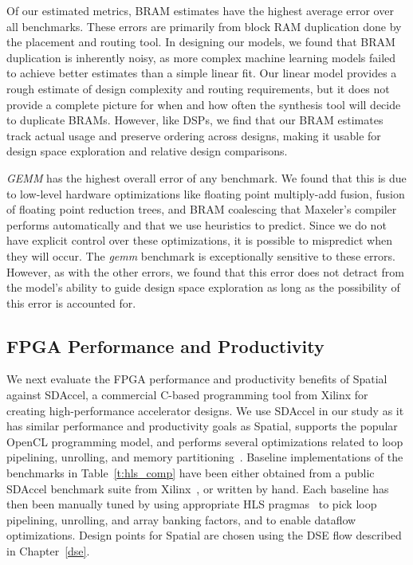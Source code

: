 Of our estimated metrics, BRAM estimates have the highest average error over all benchmarks. These errors are primarily from block RAM duplication done by the placement and routing tool. In designing our models, we found that BRAM duplication is inherently noisy, as more complex machine learning models failed to achieve better estimates than a simple linear fit. Our linear model provides a rough estimate of design complexity and routing requirements, but it does not provide a complete picture for when and how often the synthesis tool will decide to duplicate BRAMs. However, like DSPs, we find that our BRAM estimates track actual usage and preserve ordering across designs, making it usable for design space exploration and relative design comparisons.

\emph{GEMM} has the highest overall error of any benchmark. We found that this is due to low-level hardware optimizations like floating point multiply-add fusion, fusion of floating point reduction trees, and BRAM coalescing that Maxeler's compiler performs automatically and that we use heuristics to predict. Since we do not have explicit control over these optimizations, it is possible to mispredict when they will occur. The \emph{gemm} benchmark is exceptionally sensitive to these errors. However, as with the other errors, we found that this error does not detract from the model's ability to guide design space exploration as long as the possibility of this error is accounted for.


\subsection{FPGA Performance and Productivity}



We next evaluate the FPGA performance and productivity benefits of Spatial against SDAccel, a commercial C-based programming tool from Xilinx for creating high-performance accelerator designs. We use SDAccel in our study as it has similar performance and productivity goals as Spatial, supports the popular OpenCL programming model, and performs several optimizations related to loop pipelining, unrolling, and memory partitioning~\cite{sdaccel}. Baseline implementations of the benchmarks in Table~\ref{t:hls_comp} have been either obtained from a public SDAccel benchmark suite from Xilinx~\cite{sdaccelBench}, or written by hand. Each baseline has then been manually tuned by using appropriate HLS pragmas~\cite{hlsPragmaRef} to pick loop pipelining, unrolling, and array banking factors, and to enable dataflow optimizations. Design points for Spatial are chosen using the DSE flow described in Chapter~\ref{dse}.

